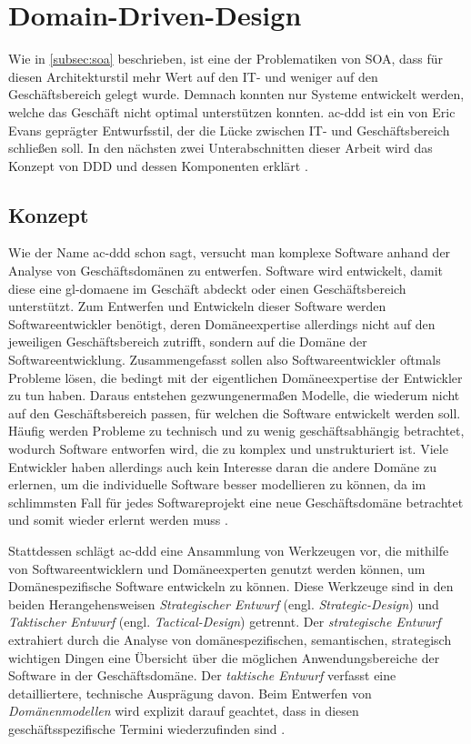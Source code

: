 \section{Domain-Driven-Design}
\label{sec:domain-driven-design}
Wie in \autoref{subsec:soa} beschrieben, ist eine der Problematiken von SOA, dass für diesen Architekturstil mehr Wert auf den IT- und weniger auf den Geschäftsbereich gelegt wurde. Demnach konnten nur Systeme entwickelt werden, welche das Geschäft nicht optimal unterstützen konnten. \acrfull{ac-ddd} ist ein von Eric Evans geprägter Entwurfsstil, der die Lücke zwischen IT- und Geschäftsbereich schließen soll. In den nächsten zwei Unterabschnitten dieser Arbeit wird das Konzept von DDD und dessen Komponenten erklärt \parencite[S. 16]{takai2017architektur}.

    \subsection{Konzept}
    \label{subsec:konzept}
    Wie der Name \acrfull{ac-ddd} schon sagt, versucht man komplexe Software anhand der Analyse von Geschäftsdomänen zu entwerfen. Software wird entwickelt, damit diese eine \gls{gl-domaene} im Geschäft abdeckt oder einen Geschäftsbereich unterstützt. Zum Entwerfen und Entwickeln dieser Software werden Softwareentwickler benötigt, deren Domäneexpertise allerdings nicht auf den jeweiligen Geschäftsbereich zutrifft, sondern auf die Domäne der Softwareentwicklung. Zusammengefasst sollen also Softwareentwickler oftmals Probleme lösen, die bedingt mit der eigentlichen Domäneexpertise der Entwickler zu tun haben. Daraus entstehen gezwungenermaßen Modelle, die wiederum nicht auf den Geschäftsbereich passen, für welchen die Software entwickelt werden soll. Häufig werden Probleme zu technisch und zu wenig geschäftsabhängig betrachtet, wodurch Software entworfen wird, die zu komplex und unstrukturiert ist. Viele Entwickler haben allerdings auch kein Interesse daran die andere Domäne zu erlernen, um die individuelle Software besser modellieren zu können, da im schlimmsten Fall für jedes Softwareprojekt eine neue Geschäftsdomäne betrachtet und somit wieder erlernt werden muss \parencite[S. 4--6]{evans2004domain}.

    Stattdessen schlägt \gls{ac-ddd} eine Ansammlung von Werkzeugen vor, die mithilfe von Softwareentwicklern und Domäneexperten genutzt werden können, um Domänespezifische Software entwickeln zu können. Diese Werkzeuge sind in den beiden Herangehensweisen \emph{Strategischer Entwurf} (engl. \emph{Strategic-Design}) und \emph{Taktischer Entwurf} (engl. \emph{Tactical-Design}) getrennt. Der \emph{strategische Entwurf} extrahiert durch die Analyse von domänespezifischen, semantischen, strategisch wichtigen Dingen eine Übersicht über die möglichen Anwendungsbereiche der Software in der Geschäftsdomäne. Der \emph{taktische Entwurf} verfasst eine detailliertere, technische Ausprägung davon. Beim Entwerfen von \emph{Domänenmodellen} wird explizit darauf geachtet, dass in diesen geschäftsspezifische Termini wiederzufinden sind \parencites[S. 3]{evans2004domain}{vernon2016domain}.

